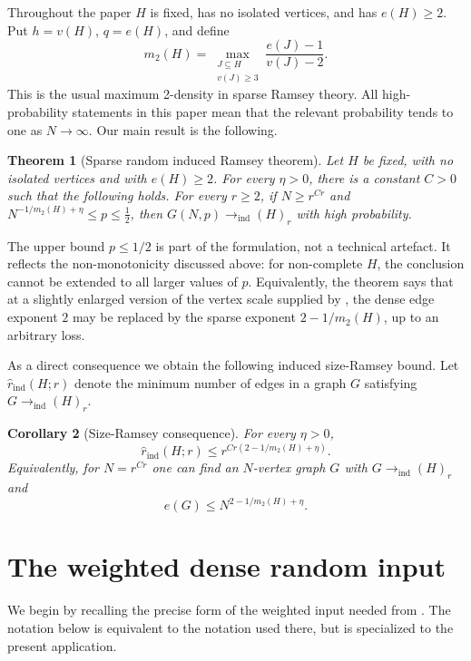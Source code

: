 \documentclass[11pt,reqno]{amsart}
\numberwithin{equation}{section}
\theoremstyle{plain}
\newtheorem{theorem}{Theorem}[section]
\newtheorem{corollary}[theorem]{Corollary}
\theoremstyle{definition}
\newcommand{\ind}{\mathrm{ind}}
\begin{document}
Throughout the paper $H$ is fixed, has no isolated vertices, and has
$e(H)\ge2$.  Put $ h=v(H)$, $ q=e(H)$, and define
$$
        m_2(H)=
        \max_{\substack{J\subseteq H\\ v(J)\ge3}}
        \frac{e(J)-1}{v(J)-2}.
$$
This is the usual maximum 2-density in sparse Ramsey theory.  All
high-probability statements in this paper mean that the relevant probability
tends to one as $N\to\infty$.  Our main result is the following.

\begin{theorem}[Sparse random induced Ramsey theorem]
\label{thm:main}
Let $H$ be fixed, with no isolated vertices and with $e(H)\ge2$.  For every
$\eta>0$, there is a constant $C>0$ such that the following holds.
For every $r\ge2$, if $ N\ge r^{Cr}$ and $ N^{-1/m_2(H)+\eta}\le p\le \frac12$,
then $ G(N,p)\longrightarrow_{\ind}(H)_r$ with high probability.
\end{theorem}

The upper bound $p\le1/2$ is part of the formulation, not a technical
artefact.  It reflects the non-monotonicity discussed above: for non-complete
$H$, the conclusion cannot be extended to all larger values of $p$.
Equivalently, the theorem says that at a slightly enlarged version of the
vertex scale supplied by \cite{ACDFM}, the dense edge exponent $2$ may be
replaced by the sparse exponent $2-1/m_2(H)$, up to an arbitrary loss.

As a direct consequence we obtain the following induced size-Ramsey bound.  Let
$\widehat r_{\ind}(H;r)$ denote the minimum number of edges in a graph
$G$ satisfying $G\to_{\ind}(H)_r$.

\begin{corollary}[Size-Ramsey consequence]
\label{cor:size}
For every $\eta>0$,
$$
        \widehat r_{\ind}(H;r)
        \le r^{Cr(2-1/m_2(H)+\eta)}.
$$
Equivalently, for $N=r^{Cr}$ one can find an $N$-vertex graph
$G$ with $G\to_{\ind}(H)_r$ and
$$
        e(G)\le N^{2-1/m_2(H)+\eta}.
$$
\end{corollary}
\medskip
\section{The weighted dense random input}
\label{sec:weighted-input}

We begin by recalling the precise form of the weighted input needed from
\cite{ACDFM}.  The notation below is equivalent to the notation used there, but
is specialized to the present application.
\end{document}
